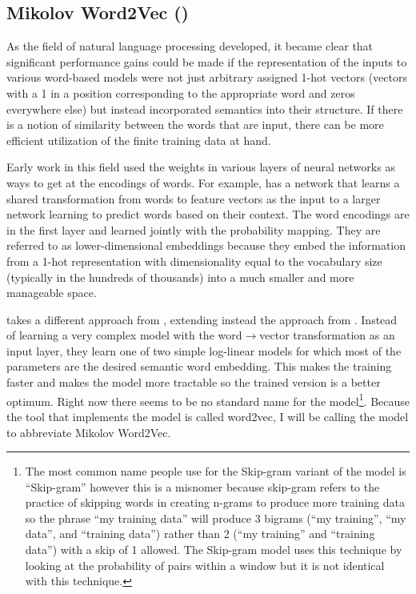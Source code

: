 \subsection{Mikolov Word2Vec (\modelname{})}

As the field of natural language processing developed, it became clear that 
significant performance gains could be made if the representation of the inputs
to various word-based models were not just arbitrary assigned 1-hot vectors
(vectors with a 1 in a position corresponding to the appropriate word and zeros
everywhere else) but instead incorporated semantics into their structure. 
If there is a notion of similarity between the words that are input, there can 
be more efficient utilization of the finite training data at hand.

Early work in this field used the weights in various layers of neural networks
as ways to get at the encodings of words. For example, \citep{Bengio2003} has
a network that learns a shared transformation from words to feature vectors 
as the input to a larger network learning to predict words based on their 
context. The word encodings are in the first layer and learned jointly with
the probability mapping. They are referred to as lower-dimensional embeddings
because they embed the information from a 1-hot representation with 
dimensionality equal to the vocabulary size (typically in the hundreds of 
thousands) into a much smaller and more manageable space.

\citep{Mikolov2013b} takes a different approach from \citep{Bengio2003},
extending instead the approach from \citep{Mikolov2007}. 
Instead of learning a very 
complex model with the word$\rightarrow$vector transformation as an input layer, they
learn one of two simple log-linear models for which most of the parameters
are the desired semantic word embedding. This makes the training faster and
makes the model more tractable so the trained version is a better optimum.
Right now there seems to be no standard name for the model\footnote{The most 
common name people use for the
Skip-gram variant of the model is ``Skip-gram'' however this is a misnomer 
because skip-gram refers to the practice of skipping words in creating n-grams
to produce more training data \citep[see][]{Guthrie2006} so the phrase 
``my training data'' will produce 3 bigrams (``my training'', ``my data'', 
and ``training data'') rather than 2 (``my training'' and ``training data'')
with a skip of 1 allowed. The Skip-gram model uses this technique by looking
at the probability of pairs within a window but it is not identical with this
technique.
}. Because the tool that implements the model is called word2vec, I will be 
calling the model \modelname{} to abbreviate 
Mikolov Word2Vec.

